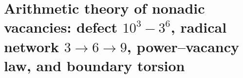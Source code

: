 \chapter{Arithmetic theory of nonadic vacancies: defect \(10^3-3^6\), radical network \(3\to6\to9\), power--vacancy law, and boundary torsion}
\label{chap:p3-final:47:vacancias_nonadicas}


